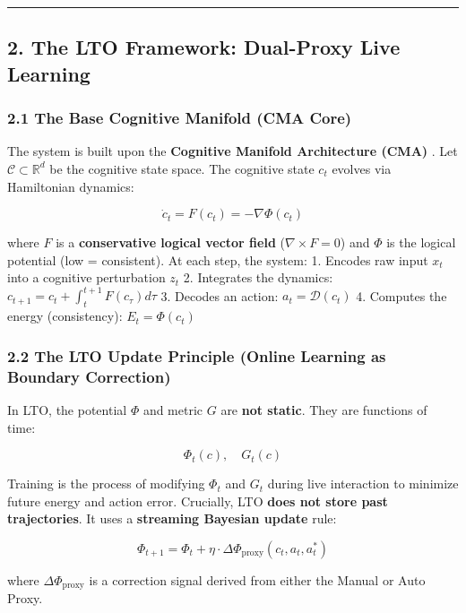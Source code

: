 \documentclass[
  11pt,
  a4paper,
]{article}
\begin{document}
\begin{center}\rule{0.5\linewidth}{0.5pt}\end{center}

\subsection{2. The LTO Framework: Dual-Proxy Live
Learning}\label{the-lto-framework-dual-proxy-live-learning}

\subsubsection{2.1 The Base Cognitive Manifold (CMA
Core)}\label{the-base-cognitive-manifold-cma-core}

The system is built upon the \textbf{Cognitive Manifold Architecture
(CMA)} . Let \(\mathcal{C} \subset \mathbb{R}^d\) be the cognitive state
space. The cognitive state \(c_t\) evolves via Hamiltonian dynamics:

\[\dot{c}_t = F(c_t) = -\nabla \Phi(c_t)\]

where \(F\) is a \textbf{conservative logical vector field}
(\(\nabla \times F = 0\)) and \(\Phi\) is the logical potential (low =
consistent). At each step, the system: 1. Encodes raw input \(x_t\) into
a cognitive perturbation \(z_t\) 2. Integrates the dynamics:
\(c_{t+1} = c_t + \int_t^{t+1} F(c_\tau) d\tau\) 3. Decodes an action:
\(a_t = \mathcal{D}(c_t)\) 4. Computes the energy (consistency):
\(E_t = \Phi(c_t)\)

\subsubsection{2.2 The LTO Update Principle (Online Learning as Boundary
Correction)}\label{the-lto-update-principle-online-learning-as-boundary-correction}

In LTO, the potential \(\Phi\) and metric \(G\) are \textbf{not static}.
They are functions of time:

\[\Phi_t(c), \quad G_t(c)\]

Training is the process of modifying \(\Phi_t\) and \(G_t\) during live
interaction to minimize future energy and action error. Crucially, LTO
\textbf{does not store past trajectories}. It uses a \textbf{streaming
Bayesian update} rule:

\[\Phi_{t+1} = \Phi_t + \eta \cdot \Delta \Phi_{\text{proxy}}(c_t, a_t, a_t^*)\]

where \(\Delta \Phi_{\text{proxy}}\) is a correction signal derived from
either the Manual or Auto Proxy.
\end{document}

